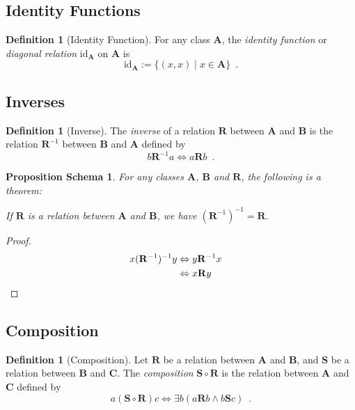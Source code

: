\documentclass{book}
\let\qed\relax
\newtheorem{props}[ax]{Proposition Schema}
\theoremstyle{definition}
\newtheorem{df}[ax]{Definition}
\begin{document}
\subsection{Identity Functions}

\begin{df}[Identity Function]
For any class $\mathbf{A}$, the \emph{identity function} or \emph{diagonal relation} $\mathrm{id}_\mathbf{A}$ on $\mathbf{A}$ is
\[ \mathrm{id}_\mathbf{A} := \{(x,x) \mid x \in \mathbf{A} \} \enspace . \]
\end{df}

\subsection{Inverses}

\begin{df}[Inverse]
The \emph{inverse} of a relation $\mathbf{R}$ between $\mathbf{A}$ and $\mathbf{B}$ is the relation $\mathbf{R}^{-1}$ between $\mathbf{B}$ and $\mathbf{A}$ defined by
\[ b \mathbf{R}^{-1} a \Leftrightarrow a \mathbf{R} b \enspace . \]
\end{df}

\begin{props}
For any classes $\mathbf{A}$, $\mathbf{B}$ and $\mathbf{R}$, the following is a theorem:

If $\mathbf{R}$ is a relation between $\mathbf{A}$ and $\mathbf{B}$, we have $(\mathbf{R}^{-1})^{-1} = \mathbf{R}$.
\end{props}

\begin{proof}
\pf
\begin{align*}
x (\mathbf{R}^{-1})^{-1} y & \Leftrightarrow y \mathbf{R}^{-1} x \\
& \Leftrightarrow x \mathbf{R} y & \qed
\end{align*}
\end{proof}

\subsection{Composition}

\begin{df}[Composition]
Let $\mathbf{R}$ be a relation between $\mathbf{A}$ and $\mathbf{B}$, and $\mathbf{S}$ be a relation between $\mathbf{B}$ and $\mathbf{C}$. The \emph{composition} $\mathbf{S} \circ \mathbf{R}$ is the relation between $\mathbf{A}$ and $\mathbf{C}$ defined by
\[ a (\mathbf{S} \circ \mathbf{R}) c \Leftrightarrow \exists b (a \mathbf{R} b \wedge b \mathbf{S} c) \enspace. \]
\end{df}
\end{document}
